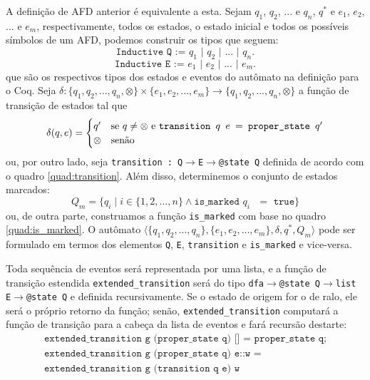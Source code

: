 
A definição de AFD anterior é equivalente a esta. Sejam $q_1$, $q_2$, $...$ e $q_n$, $q^*$ e $e_1$, $e_2$, $...$ e $e_m$, respectivamente, todos os estados, o estado inicial e todos os possíveis símbolos de um AFD, podemos construir os tipos que seguem: $$\texttt{Inductive Q := $q_1$ | $q_2$ | $...$ | $q_n$.}$$ $$\texttt{Inductive E := $e_1$ | $e_2$ | $...$ | $e_m$.}$$ que são os respectivos tipos dos estados e eventos do autômato na definição para o Coq. Seja $\delta : \{ q_1, q_2, ..., q_n, \otimes \} \times \{ e_1, e_2, ..., e_m \} \to \{ q_1, q_2, ..., q_n, \otimes \}$ a função de transição de estados tal que $$\delta(q, e) = \begin{cases}
q' & \text{se $q \neq \otimes$ e \texttt{transition $q$ $e$ $=$ proper\_state $q'$}} \\
\otimes & \text{senão}
\end{cases}$$ ou, por outro lado, seja \texttt{transition : Q$\to$E$\to$@state Q} definida de acordo com o quadro \ref{quad:transition}. Além disso, determinemos o conjunto de estados marcados: $$Q_m = \{ q_i \mid i \in \{ 1, 2, ..., n \} \wedge \texttt{is\_marked $q_i$ $=$ true} \}$$ ou, de outra parte, construamos a função \texttt{is\_marked} com base no quadro \ref{quad:is_marked}. O autômato $\langle \{ q_1, q_2, ..., q_n \}, \{ e_1, e_2, ..., e_m \}, \delta, q^*, Q_m \rangle$ pode ser formulado em termos dos elementos \texttt{Q}, \texttt{E}, \texttt{transition} e \texttt{is\_marked} e vice-versa.

Toda sequência de eventos será representada por uma lista, e a função de transição estendida \texttt{extended\_transition} será do tipo \texttt{dfa$\rightarrow$@state Q$\rightarrow$list E$\rightarrow$@state Q} e definida recursivamente. Se o estado de origem for o de ralo, ele será o próprio retorno da função; senão, \texttt{extended\_transition} computará a função de transição para a cabeça da lista de eventos e fará recursão destarte: \begin{gather*}
\texttt{extended\_transition g (proper\_state q) [] = proper\_state q;}\\\texttt{extended\_transition g (proper\_state q) e::w =}\\\texttt{extended\_transition g (transition q e) w}\end{gather*}

